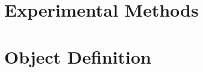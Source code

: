 \documentclass[edeposit,fullpage]{uiucthesis2009}
\begin{document}
\chapter{Experimental Methods}


\chapter{Object Definition}

\end{document}
